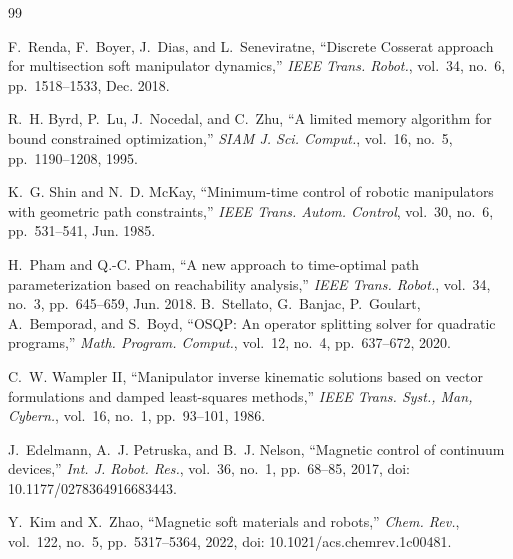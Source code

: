 \documentclass[journal]{IEEEtran}
\begin{document}
\begin{thebibliography}{99}
\footnotesize


F.~Renda, F.~Boyer, J.~Dias, and L.~Seneviratne, ``Discrete Cosserat
approach for multisection soft manipulator dynamics,'' \emph{IEEE Trans.
Robot.}, vol.~34, no.~6, pp.~1518--1533, Dec. 2018.


R.~H. Byrd, P.~Lu, J.~Nocedal, and C.~Zhu, ``A limited memory algorithm
for bound constrained optimization,'' \emph{SIAM J. Sci. Comput.},
vol.~16, no.~5, pp.~1190--1208, 1995.


K.~G. Shin and N.~D. McKay, ``Minimum-time control of robotic
manipulators with geometric path constraints,'' \emph{IEEE Trans. Autom.
Control}, vol.~30, no.~6, pp.~531--541, Jun. 1985.

H.~Pham and Q.-C. Pham, ``A new approach to time-optimal path
parameterization based on reachability analysis,'' \emph{IEEE Trans.
Robot.}, vol.~34, no.~3, pp.~645--659, Jun. 2018.
B.~Stellato, G.~Banjac, P.~Goulart, A.~Bemporad, and S.~Boyd, ``OSQP: An
operator splitting solver for quadratic programs,'' \emph{Math. Program.
Comput.}, vol.~12, no.~4, pp.~637--672, 2020.



C.~W. Wampler II, \textquotedblleft Manipulator inverse kinematic
solutions based on vector formulations and damped least-squares
methods,\textquotedblright{} \emph{IEEE Trans. Syst., Man, Cybern.},
vol.~16, no.~1, pp.~93--101, 1986.

J.~Edelmann, A.~J. Petruska, and B.~J. Nelson, ``Magnetic control of
continuum devices,'' \emph{Int. J. Robot. Res.}, vol.~36, no.~1,
pp.~68--85, 2017, doi: 10.1177/0278364916683443.


Y.~Kim and X.~Zhao, ``Magnetic soft materials and robots,''
\emph{Chem. Rev.}, vol.~122, no.~5, pp.~5317--5364, 2022,
doi: 10.1021/acs.chemrev.1c00481.

\end{thebibliography}
\end{document}
